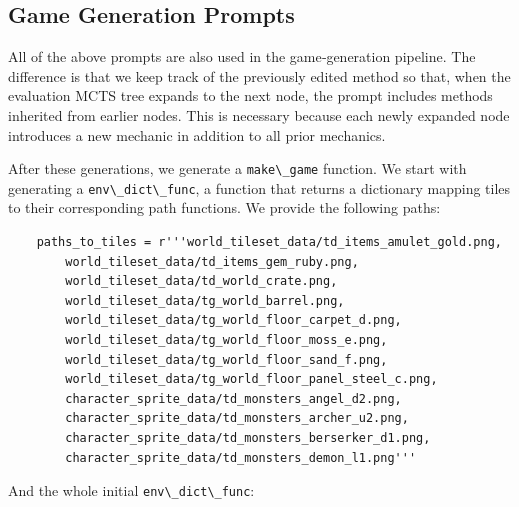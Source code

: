 \documentclass{article} %
\begin{document}
\subsection{Game Generation Prompts}

All of the above prompts are also used in the game‑generation pipeline. The difference is that we keep track of the previously edited method so that, when the evaluation MCTS tree expands to the next node, the prompt includes methods inherited from earlier nodes. This is necessary because each newly expanded node introduces a new mechanic in addition to all prior mechanics.

After these generations, we generate a \lstinline|make\_game| function. We start with generating a \lstinline|env\_dict\_func|, a function that returns a dictionary mapping tiles to their corresponding path functions. We provide the following paths:

\begin{lstlisting}
    paths_to_tiles = r'''world_tileset_data/td_items_amulet_gold.png,
        world_tileset_data/td_items_gem_ruby.png,
        world_tileset_data/td_world_crate.png,
        world_tileset_data/tg_world_barrel.png,
        world_tileset_data/tg_world_floor_carpet_d.png,
        world_tileset_data/tg_world_floor_moss_e.png,
        world_tileset_data/tg_world_floor_sand_f.png,
        world_tileset_data/tg_world_floor_panel_steel_c.png,
        character_sprite_data/td_monsters_angel_d2.png,
        character_sprite_data/td_monsters_archer_u2.png,
        character_sprite_data/td_monsters_berserker_d1.png,
        character_sprite_data/td_monsters_demon_l1.png'''
\end{lstlisting}

And the whole initial \lstinline|env\_dict\_func|:
\end{document}

